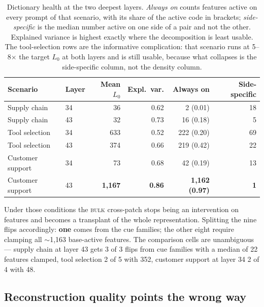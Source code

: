 \documentclass{article}
\begin{document}
\begin{table}[t]
\caption{Dictionary health at the two deepest layers. \emph{Always on} counts features active on every prompt of that scenario, with its share of the active code in brackets; \emph{side-specific} is the median number active on one side of a pair and not the other. Explained variance is highest exactly where the decomposition is least usable. The tool-selection rows are the informative complication: that scenario runs at 5--8$\times$ the target $L_0$ at both layers and is still usable, because what collapses is the side-specific column, not the density column.}
\label{tab:health}
\centering
\small
\setlength{\tabcolsep}{5pt}
\begin{tabular}{@{}llrrrr@{}}
\toprule
Scenario & Layer & Mean $L_0$ & Expl.\ var. & Always on & Side-specific \\
\midrule
Supply chain     & 34 & 36 & 0.62 & 2 (0.01) & 18 \\
Supply chain     & 43 & 32 & 0.73 & 16 (0.18) & 5 \\
Tool selection   & 34 & 633 & 0.52 & 222 (0.20) & 69 \\
Tool selection   & 43 & 374 & 0.66 & 219 (0.42) & 22 \\
Customer support & 34 & 73 & 0.68 & 42 (0.19) & 13 \\
Customer support & 43 & \textbf{1{,}167} & \textbf{0.86} & \textbf{1{,}162 (0.97)} & \textbf{1} \\
\bottomrule
\end{tabular}
\end{table}

Under those conditions the \textsc{bulk} cross-patch stops being an intervention on features and becomes a transplant of the whole representation. Splitting the nine flips accordingly: \textbf{one} comes from the cue families; the other eight require clamping all $\sim$1{,}163 base-active features. The comparison cells are unambiguous --- supply chain at layer 43 gets 3 of 3 flips from cue families with a median of 22 features clamped, tool selection 2 of 5 with 352, customer support at layer 34 2 of 4 with 48.

\subsection{Reconstruction quality points the wrong way}
\end{document}
